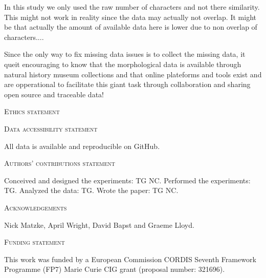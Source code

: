 \documentclass[12pt,letterpaper]{article}
\renewcommand{\section}[1]{%
\bigskip
\begin{center}
\begin{Large}
\normalfont\scshape #1
\medskip
\end{Large}
\end{center}}
\begin{document}

In this study we only used the raw number of characters and not there similarity. This might not work in reality since the data may actually not overlap. It might be that actually the amount of available data here is lower due to non overlap of characters....

Since the only way to fix missing data issues is to collect the missing data, it queit encouraging to know that the morphological data is available through natural history museum collections and that online plateforms and tools exist and are opperational to facilitate this giant task through collaboration and sharing open source and traceable data!



\section{Ethics statement}
\section{Data accessibility statement}
All data is available and reproducible on GitHub.
\section{Authors’ contributions statement}
Conceived and designed the experiments: TG NC. Performed the experiments: TG. Analyzed the data: TG. Wrote the paper: TG NC.
\section{Acknowledgements}
Nick Matzke, April Wright, David Bapst and Graeme Lloyd.
\section{Funding statement}
This work was funded by a European Commission CORDIS Seventh Framework Programme (FP7) Marie Curie CIG grant (proposal number: 321696).





\newcommand{\beginsupplement}{%
    \setcounter{table}{0}
    \renewcommand{\thetable}{S\arabic{table}}%
    \setcounter{figure}{0}
    \renewcommand{\thefigure}{S\arabic{figure}}%
}
\beginsupplement



\end{document}
